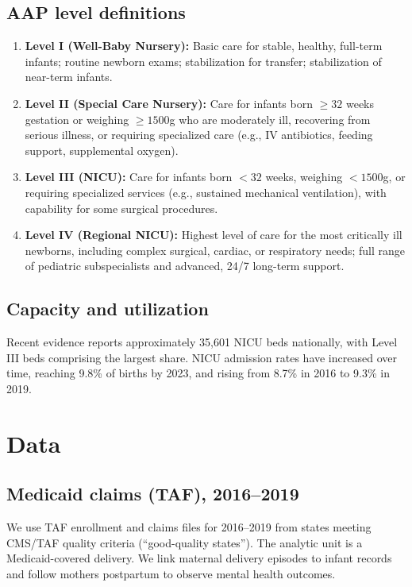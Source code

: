 \documentclass[12pt]{article}
\begin{document}
\subsection{AAP level definitions}
\begin{enumerate}[leftmargin=*, itemsep=0.25em]
  \item \textbf{Level I (Well-Baby Nursery):} Basic care for stable, healthy, full-term infants; routine newborn exams; stabilization for transfer; stabilization of near-term infants.
  \item \textbf{Level II (Special Care Nursery):} Care for infants born $\geq 32$ weeks gestation or weighing $\geq 1500$g who are moderately ill, recovering from serious illness, or requiring specialized care (e.g., IV antibiotics, feeding support, supplemental oxygen).
  \item \textbf{Level III (NICU):} Care for infants born $<32$ weeks, weighing $<1500$g, or requiring specialized services (e.g., sustained mechanical ventilation), with capability for some surgical procedures.
  \item \textbf{Level IV (Regional NICU):} Highest level of care for the most critically ill newborns, including complex surgical, cardiac, or respiratory needs; full range of pediatric subspecialists and advanced, 24/7 long-term support.
\end{enumerate}

\subsection{Capacity and utilization}
Recent evidence reports approximately 35,601 NICU beds nationally, with Level III beds comprising the largest share. NICU admission rates have increased over time, reaching 9.8\% of births by 2023, and rising from 8.7\% in 2016 to 9.3\% in 2019.

\section{Data}
\subsection{Medicaid claims (TAF), 2016--2019}
We use TAF enrollment and claims files for 2016--2019 from states meeting CMS/TAF quality criteria (``good-quality states''). The analytic unit is a Medicaid-covered delivery. We link maternal delivery episodes to infant records and follow mothers postpartum to observe mental health outcomes.
\end{document}
